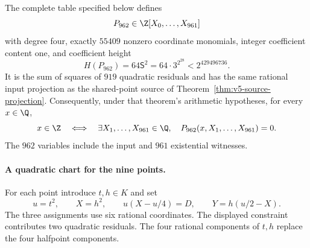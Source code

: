 \begin{theorem}
\label{thm:v6-962-polynomial}
The complete table specified below defines
\[
 P_{962}\in\Z[X_0,\ldots,X_{961}]
\]
with degree four, exactly $55409$ nonzero coordinate monomials, integer
coefficient content one, and coefficient height
\[
 H(P_{962})=64\mathsf S^2=64\cdot3^{2^{28}}<2^{429496736}.
\]
It is the sum of squares of $919$ quadratic residuals and has the same
rational input projection as the shared-point source of
Theorem~\ref{thm:v5-source-projection}. Consequently, under that theorem's
arithmetic hypotheses, for every $x\in\Q$,
\[
 x\in\Z\quad\Longleftrightarrow\quad
 \exists X_1,\ldots,X_{961}\in\Q,\quad
 P_{962}(x,X_1,\ldots,X_{961})=0.
\]
The $962$ variables include the input and $961$ existential witnesses.
\end{theorem}

\paragraph{A quadratic chart for the nine points.}
For each point introduce $t,h\in K$ and set
\begin{equation}\label{eq:v6-point-chart}
 u=t^2,\qquad X=h^2,\qquad
 u(X-u/4)=D,\qquad Y=h(u/2-X).
\end{equation}
The three assignments use six rational coordinates. The displayed
constraint contributes two quadratic residuals. The four rational
components of $t,h$ replace the four halfpoint components.

